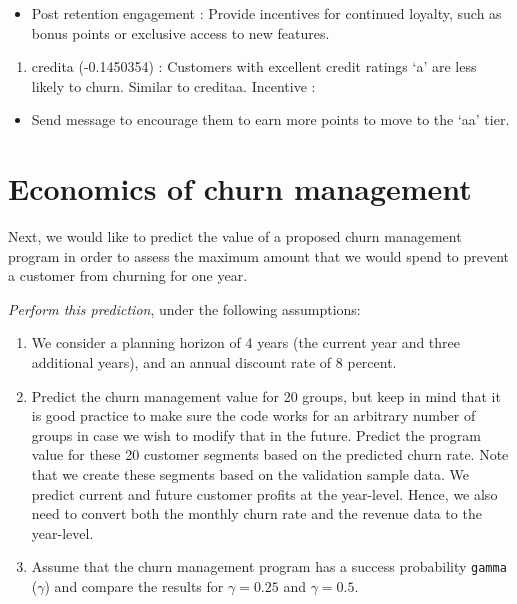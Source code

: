 \documentclass[
]{article}
\providecommand{\tightlist}{%
  \setlength{\itemsep}{0pt}\setlength{\parskip}{0pt}}
\begin{document}
\begin{itemize}
\tightlist
\item
  Post retention engagement : Provide incentives for continued loyalty,
  such as bonus points or exclusive access to new features.
\end{itemize}

\begin{enumerate}
\def\labelenumi{\arabic{enumi}.}
\setcounter{enumi}{2}
\tightlist
\item
  credita (-0.1450354) : Customers with excellent credit ratings `a' are
  less likely to churn. Similar to creditaa. Incentive :
\end{enumerate}

\begin{itemize}
\tightlist
\item
  Send message to encourage them to earn more points to move to the `aa'
  tier.
\end{itemize}

\newpage

\section{Economics of churn
management}\label{economics-of-churn-management}

Next, we would like to predict the value of a proposed churn management
program in order to assess the maximum amount that we would spend to
prevent a customer from churning for one year.

\emph{Perform this prediction}, under the following assumptions:

\begin{enumerate}
\def\labelenumi{\arabic{enumi}.}
\tightlist
\item
  We consider a planning horizon of 4 years (the current year and three
  additional years), and an annual discount rate of 8 percent.
\item
  Predict the churn management value for 20 groups, but keep in mind
  that it is good practice to make sure the code works for an arbitrary
  number of groups in case we wish to modify that in the future. Predict
  the program value for these 20 customer segments based on the
  predicted churn rate. Note that we create these segments based on the
  validation sample data. We predict current and future customer profits
  at the year-level. Hence, we also need to convert both the monthly
  churn rate and the revenue data to the year-level.
\item
  Assume that the churn management program has a success probability
  \texttt{gamma} (\(\gamma\)) and compare the results for
  \(\gamma=0.25\) and \(\gamma=0.5\).
\end{enumerate}
\end{document}
